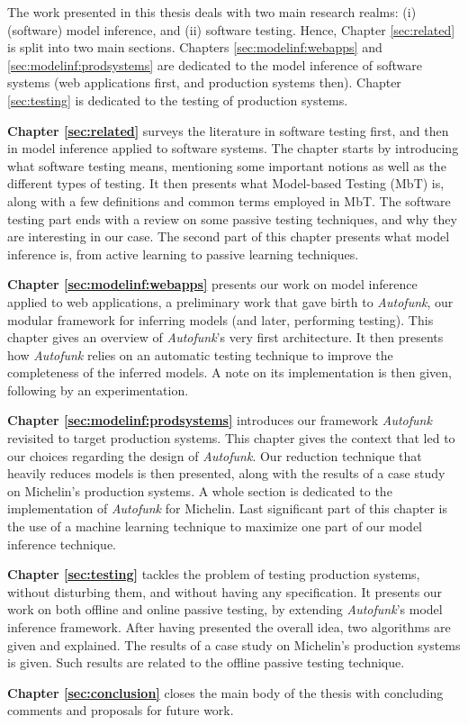 The work presented in this thesis deals with two main research
realms: (i) (software) model inference, and (ii) software
testing. Hence, Chapter \ref{sec:related} is split into two main
sections. Chapters \ref{sec:modelinf:webapps} and
\ref{sec:modelinf:prodsystems} are dedicated to the model
inference of software systems (web applications first, and
production systems then). Chapter \ref{sec:testing} is dedicated
to the testing of production systems.

\textbf{Chapter \ref{sec:related}} surveys the literature in
software testing first, and then in model inference applied to
software systems. The chapter starts by introducing what software
testing means, mentioning some important notions as well as the
different types of testing. It then presents what Model-based
Testing (MbT) is, along with a few definitions and common terms
employed in MbT. The software testing part ends with a review on
some passive testing techniques, and why they are interesting in
our case. The second part of this chapter presents what model
inference is, from active learning to passive learning
techniques.

\textbf{Chapter \ref{sec:modelinf:webapps}} presents our work on
model inference applied to web applications, a preliminary work
that gave birth to \textit{Autofunk}, our modular framework for
inferring models (and later, performing testing). This chapter
gives an overview of \textit{Autofunk}'s very first architecture. It then
presents how \textit{Autofunk} relies on an automatic testing technique to
improve the completeness of the inferred models. A note on its
implementation is then given, following by an experimentation.


\textbf{Chapter \ref{sec:modelinf:prodsystems}} introduces our
framework \textit{Autofunk} revisited to target production systems. This
chapter gives the context that led to our choices regarding the
design of \textit{Autofunk}. Our reduction technique that heavily reduces
models is then presented, along with the results of a case study
on Michelin's production systems. A whole section is dedicated to
the implementation of \textit{Autofunk} for Michelin. Last significant
part of this chapter is the use of a machine learning technique
to maximize one part of our model inference technique.

\textbf{Chapter \ref{sec:testing}} tackles the problem of testing
production systems, without disturbing them, and without having
any specification. It presents our work on both offline and
online passive testing, by extending \textit{Autofunk}'s model inference
framework. After having presented the overall idea, two algorithms
are given and explained. The results of a case study on
Michelin's production systems is given. Such results are related
to the offline passive testing technique.

\textbf{Chapter \ref{sec:conclusion}} closes the main body of the
thesis with concluding comments and proposals for future work.

\cleardoublepage
\blankpage
